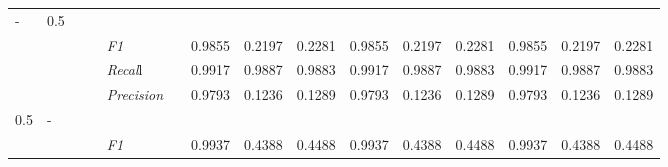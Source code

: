 \begin{table}[]
\begin{tabularx}{\textwidth}{XXlllllllllllll@{}}
- & 0.5 &  &  &                                                              &                                                                   &                                                             &                                                               &                                                                    &                                                              &                                                               &                                                                    &                                                              \\
                                                                    &                                                                     &                                                           &    & \textit{F1} &                                                      & 0.9855        & 0.2197        & 0.2281        & 0.9855        & 0.2197        & 0.2281        & 0.9855        & 0.2197        & 0.2281        \\
                                                                    &                                                                     &                                                           &    & \textit{Recal}l &                                                      & 0.9917    & 0.9887    & 0.9883    & 0.9917    & 0.9887    & 0.9883    & 0.9917    & 0.9887    & 0.9883    \\
                                                                    &                                                                     &                                                           &    & \textit{Precision} &                                                      & 0.9793 & 0.1236 & 0.1289 & 0.9793 & 0.1236 & 0.1289 & 0.9793 & 0.1236 & 0.1289 \\ \midrule
0.5 & - &  &  &                                                              &                                                                   &                                                             &                                                               &                                                                    &                                                              &                                                               &                                                                    &                                                              \\
                                                                    &                                                                     &                                                           &    & \textit{F1} &                                                      & 0.9937        & 0.4388        & 0.4488        & 0.9937        & 0.4388        & 0.4488        & 0.9937        & 0.4388        & 0.4488        \\

\end{tabularx}
\end{table}
